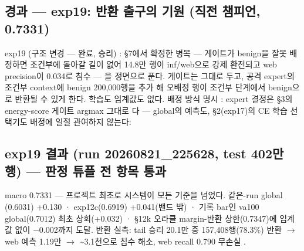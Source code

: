 \subsection*{경과 — exp19: 반환 출구의 기원 (직전 챔피언, 0.7331)}
exp19 (구조 변경 — 완료, 승리) : §7에서 확정한 병목 — 게이트가 benign을 잘못 배정하면 조건부에 돌아갈 길이 없어 14.8만 행이 inf/\allowbreak{}web으로 강제 환전되고 web precision이 0.034로 침수 — 을 정면으로 푼다. 게이트는 그대로 두고, 공격 expert의 조건부 context에 benign 200,000행을 추가 해 오배정 행이 조건부 단계에서 benign으로 반환될 수 있게 한다. 학습도 임계값도 없다. 배정 방식 명시 : expert 결정은 §3의 energy-score 게이트 argmax 그대로 다 — global의 예측도, §2(exp17)의 CE 학습 선택기도 배정에 일절 관여하지 않는다:

\subsection*{exp19 결과 (run 20260821\_\allowbreak{}225628, test 402만 행) — 판정 튜플 전 항목 통과}
macro 0.7331 — 프로젝트 최초로 시스템이 모든 기준을 넘었다. 같은-run global (0.6031) +\allowbreak{}0.130 · exp12c(0.6919) +\allowbreak{}0.041(밴드 밖) · 기록 bar인 va100 global(0.7012) 최초 상회(+\allowbreak{}0.032) · §12k 오라클 margin-반환 상한(0.7347)에 임계값 없이 −0.002까지 도달. 반환 실측: tail 승리 20.1만 중 157,408행(78.3\%) 반환  \ensuremath{\rightarrow}  web 예측 1.19만 \ensuremath{\rightarrow}  \textasciitilde{}3.1천으로 침수 해소, web recall 0.790 무손실 .

